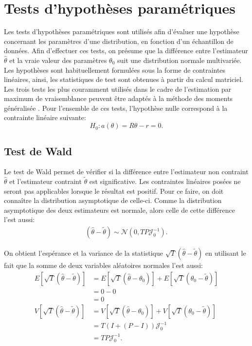 \section{Tests d'hypothèses paramétriques}
\label{sec:testparam}

Les tests d'hypothèses paramétriques sont utilisés afin d'évaluer une
hypothèse concernant les paramètres d'une distribution, en fonction
d'un échantillon de données. Afin d'effectuer ces tests, on présume
que la différence entre l'estimateur $\hat\theta$ et la vraie valeur
des paramètres $\theta_0$ suit une distribution normale
multivariée. Les hypothèses sont habituellement formulées sous la
forme de contraintes linéaires, ainsi, les statistiques de test sont
obtenues à partir du calcul matriciel. Les trois tests les plus
couramment utilisés dans le cadre de l'estimation par maximum de
vraisemblance peuvent être adaptés à la méthode des moments
généralisée \citep{newey1994large}. Pour l'ensemble de ces tests,
l'hypothèse nulle correspond à la contrainte linéaire suivante:
\begin{equation}
  \label{eq:hypcontraintelin}
  H_0: a(\theta) = R\theta - r = 0.
\end{equation}

\subsection{Test de Wald}
\label{sec:testwald}

Le test de Wald permet de vérifier si la différence entre l'estimateur
non contraint $\hat\theta$ et l'estimateur contraint $\tilde\theta$
est significative. Les contraintes linéaires posées ne seront pas
applicables lorsque le résultat est positif. Pour ce faire, on doit
connaître la distribution asymptotique de celle-ci. Comme la
distribution asymptotique des deux estimateurs est normale, alors
celle de cette différence l'est aussi:
\begin{align}
  \label{eq:7}
  (\hat\theta - \tilde\theta) \sim \mathcal{N}(0,TP\mathcal{J}_0^{-1}).
\end{align}

On obtient l'espérance et la variance de la statistique
$\sqrt{T}\left(\hat\theta - \tilde\theta\right)$ en utilisant le fait
que la somme de deux variables aléatoires normales l'est aussi:
\begin{align}
  \label{eq:moyennevariancesomme}
  E\left[\sqrt{T}\left(\hat\theta - \tilde\theta\right) \right] &=
  E\left[\sqrt{T}\left(\hat\theta - \theta_0\right) \right] +
  E\left[\sqrt{T}\left(\theta_0 - \tilde\theta\right) \right]\nonumber\\
  &= 0 - 0 \nonumber\\
  &= 0 \\
  V\left[\sqrt{T}\left(\hat\theta - \tilde\theta\right) \right] &=
  V\left[\sqrt{T}\left(\hat\theta - \theta_0\right) \right] +
  V\left[\sqrt{T}\left(\theta_0 - \tilde\theta\right) \right]\nonumber\\
  &= T\left(I+(P-I)\right)\mathcal{J}_0^{-1}\nonumber\\
  &= TP\mathcal{J}_0^{-1}.
\end{align}

